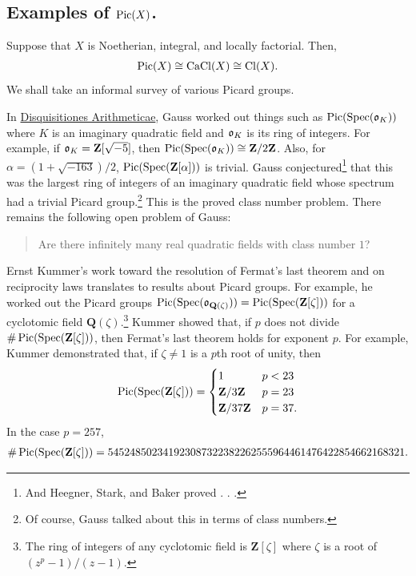 \documentclass [11 pt, oneside] {article}
\begin{document}
\subsection{Examples of \texorpdfstring{$\operatorname{Pic}(X)$}{Pic (X)}.}
Suppose that $X$ is Noetherian, integral, and locally factorial. Then,
\begin{align*}
	\operatorname{Pic}(X)\cong \operatorname{CaCl} (X) \cong \operatorname{Cl} (X).
\end{align*}
We shall take an informal survey of various Picard groups.

In \ul{Disquisitiones Arithmeticae}, Gauss worked out things such as $\operatorname{Pic} (\operatorname{Spec} (\mathfrak o_K))$ where $K$ is an imaginary quadratic field and $\mathfrak o_K$ is its ring of integers. For example, if $\mathfrak o_K = \mathbf{Z}[\sqrt{-5}] $, then $\operatorname{Pic}(\operatorname{Spec} (\mathfrak o_K))\cong \mathbf{Z}/2\mathbf{Z}$. Also, for $\alpha = (1+\sqrt{-163} ) /2$, $\operatorname{Pic} (\operatorname{Spec} (\mathbf{Z}[\alpha]))$ is trivial.
Gauss conjectured\footnote{And Heegner, Stark, and Baker proved . . .} that this was the largest ring of integers of an imaginary quadratic field whose spectrum had a trivial Picard group.\footnote{Of course, Gauss talked about this in terms of class numbers.} This is the proved class number problem. There remains the following open problem of Gauss:
\begin{quote}
	\small Are there infinitely many real quadratic fields with class number $1$?
\end{quote}

Ernst Kummer's work toward the resolution of Fermat's last theorem and on reciprocity laws translates to results about Picard groups. For example, he worked out the Picard groups $\operatorname{Pic}(\operatorname{Spec} (\mathfrak o_{\mathbf Q(\zeta)})) = \operatorname{Pic}(\operatorname{Spec} (\mathbf{Z}[\zeta]))$ for a cyclotomic field $\mathbf{Q}(\zeta)$.\footnote{The ring of integers of any cyclotomic field is $\mathbf{Z}[\zeta]$ where $\zeta$ is a root of $(z^p -1)/ (z-1)$.} 
Kummer showed that, if $p$ does not divide $\# \operatorname{Pic}(\operatorname{Spec} (\mathbf{Z}[\zeta]))$, then Fermat's last theorem holds for exponent $p$. For example, Kummer demonstrated that, if $\zeta\ne 1$ is a $p$th root of unity, then
\begin{align*}
	\operatorname{Pic}(\operatorname{Spec}(\mathbf{Z}[\zeta])) =
	\begin{cases}
		1 & p<23\\
		\mathbf{Z}/3\mathbf{Z}& p=23\\
		\mathbf{Z}/37\mathbf{Z} & p=37.
	\end{cases}
\end{align*}
In the case $p=257$,
\begin{align*}
	\# \operatorname{Pic}(\operatorname{Spec}(\mathbf{Z}[\zeta])) = 545248502341923087322382262555964461476422854662168321.
\end{align*}
\end{document}
